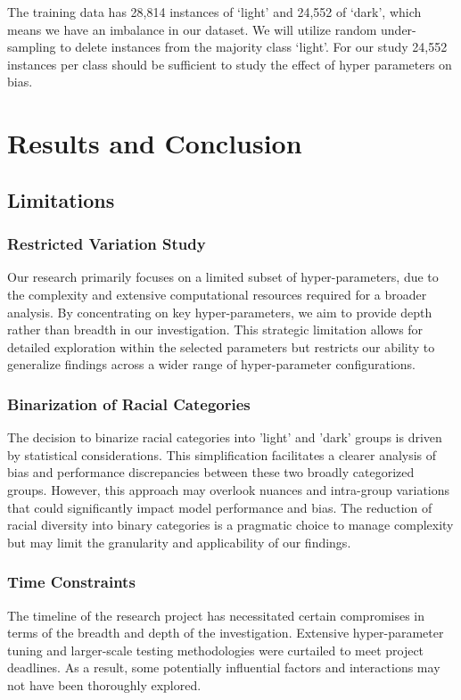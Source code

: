 \documentclass[conference]{IEEEtran}
\begin{document}
The training data has 28,814 instances of ‘light’ and 24,552 of ‘dark’, which means we have an imbalance in our dataset. We will utilize random under-sampling to delete instances from the majority class ‘light’. For our study 24,552 instances per class should be sufficient to study the effect of hyper parameters on bias.

\section{Results and Conclusion}
\subsection{Limitations}
\subsubsection{Restricted Variation Study}
Our research primarily focuses on a limited subset of hyper-parameters, due to the complexity and extensive computational resources required for a broader analysis. By concentrating on key hyper-parameters, we aim to provide depth rather than breadth in our investigation. This strategic limitation allows for detailed exploration within the selected parameters but restricts our ability to generalize findings across a wider range of hyper-parameter configurations.
\subsubsection{Binarization of Racial Categories}
The decision to binarize racial categories into 'light' and 'dark' groups is driven by statistical considerations. This simplification facilitates a clearer analysis of bias and performance discrepancies between these two broadly categorized groups. However, this approach may overlook nuances and intra-group variations that could significantly impact model performance and bias. The reduction of racial diversity into binary categories is a pragmatic choice to manage complexity but may limit the granularity and applicability of our findings.
\subsubsection{Time Constraints}
The timeline of the research project has necessitated certain compromises in terms of the breadth and depth of the investigation. Extensive hyper-parameter tuning and larger-scale testing methodologies were curtailed to meet project deadlines. As a result, some potentially influential factors and interactions may not have been thoroughly explored.
\end{document}
